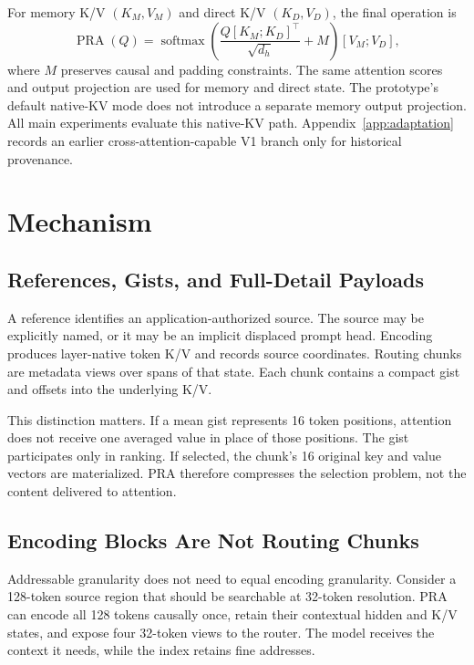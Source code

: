 \documentclass[11pt]{article}
\begin{document}
For memory K/V $(K_M,V_M)$ and direct K/V $(K_D,V_D)$, the final operation is
\begin{equation}
  \operatorname{PRA}(Q)=
  \operatorname{softmax}\!\left(
  \frac{Q[K_M;K_D]^\top}{\sqrt{d_h}} + M
  \right)[V_M;V_D],
  \label{eq:pra-attention}
\end{equation}
where $M$ preserves causal and padding constraints. The same attention scores and output
projection are used for memory and direct state. The prototype's default native-KV mode
does not introduce a separate memory output projection.
All main experiments evaluate this native-KV path. Appendix~\ref{app:adaptation} records an
earlier cross-attention-capable V1 branch only for historical provenance.

\section{Mechanism}
\label{sec:mechanism}

\subsection{References, Gists, and Full-Detail Payloads}

A reference identifies an application-authorized source. The source may be explicitly
named, or it may be an implicit displaced prompt head. Encoding produces layer-native
token K/V and records source coordinates. Routing chunks are metadata views over spans of
that state. Each chunk contains a compact gist and offsets into the underlying K/V.

This distinction matters. If a mean gist represents 16 token positions, attention does
not receive one averaged value in place of those positions. The gist participates only in
ranking. If selected, the chunk's 16 original key and value vectors are materialized. PRA
therefore compresses the selection problem, not the content delivered to attention.

\subsection{Encoding Blocks Are Not Routing Chunks}

Addressable granularity does not need to equal encoding granularity. Consider a 128-token
source region that should be searchable at 32-token resolution. PRA can encode all 128 tokens
causally once, retain their contextual hidden and K/V states, and expose four 32-token views to
the router. The model receives the context it needs, while the index retains fine addresses.
\end{document}
